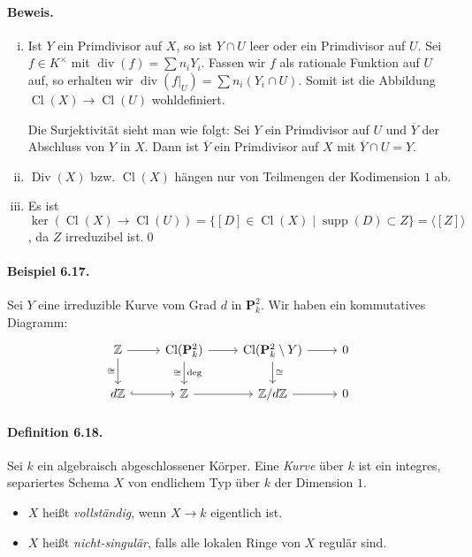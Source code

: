 \paragraph{Beweis.}\begin{enumerate}[(i)]
\item Ist $Y$ ein Primdivisor auf $X$, so ist $Y\cap U$ leer oder ein Primdivisor auf $U$. Sei $f\in K^\times$ mit $\operatorname{div}(f)=\sum n_iY_i$. Fassen wir $f$ als rationale Funktion auf $U$ auf, so erhalten wir $\operatorname{div}(f|_U)=\sum n_i(Y_i\cap U)$. Somit ist die Abbildung $\operatorname{Cl}(X)\to\operatorname{Cl}(U)$ wohldefiniert.

Die Surjektivität sieht man wie folgt: Sei $Y$ ein Primdivisor auf $U$ und $\overline{Y}$ der Abschluss von $Y$ in $X$. Dann ist $\overline{Y}$ ein Primdivisor auf $X$ mit $\overline{Y}\cap U=Y$.
\item $\operatorname{Div}(X)$ bzw. $\operatorname{Cl}(X)$ hängen nur von Teilmengen der Kodimension $1$ ab.
\item Es ist $\ker(\operatorname{Cl}(X)\to\operatorname{Cl}(U)) = \{ [D]\in\operatorname{Cl}(X)\mid \operatorname{supp}(D)\subset Z\}=\langle[Z]\rangle$, da $Z$ irreduzibel ist.\qed
\end{enumerate}

\paragraph{Beispiel 6.17.}\label{6.17} Sei $Y$ eine irreduzible Kurve vom Grad $d$ in $\mathbf{P}_k^2$. Wir haben ein kommutatives Diagramm:
\[\begin{tikzcd}
\mathbb{Z} \rar\dar["\cong"'] & \operatorname{Cl}(\mathbf{P}_k^2) \rar\dar["\cong"', "\deg"]& \operatorname{Cl}(\mathbf{P}_k^2\setminus Y) \rar\dar["\cong"]& 0\\
d\mathbb{Z} \rar[hook] & \mathbb{Z}\rar & \mathbb{Z}/d\mathbb{Z}\rar & 0
\end{tikzcd}\]

\paragraph{Definition 6.18.}\label{6.18} Sei $k$ ein algebraisch abgeschlossener Körper. Eine \textit{Kurve} über $k$ ist ein integres, separiertes Schema $X$ von endlichem Typ über $k$ der Dimension $1$.
\begin{itemize}
\item $X$ heißt \textit{vollständig}, wenn $X\to k$ eigentlich ist.
\item $X$ heißt \textit{nicht-singulär}, falls alle lokalen Ringe von $X$ regulär sind.
\end{itemize}

